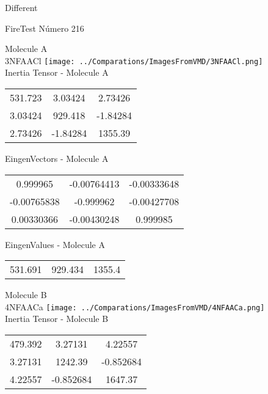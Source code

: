 \begin{center}
\vtab
\vtab
\textcolor{NavyBlue}{\Large Different}
\end{center}

 \newpage

\vtab[-2cm]
\begin{center}
{\large FireTest \tab Número 216}
\end{center}
\begin{multicols}{2}
\begin{center}

Molecule A \\ 
3NFAACl
\texttt{[image: ../Comparations/ImagesFromVMD/3NFAACl.png]}
\\
Inertia Tensor - Molecule A \\
\vtab

\begin{tabular}{|c c c|}
531.723	 & 	3.03424	 & 	2.73426	 \\
3.03424	 & 	929.418	 & 	-1.84284	 \\
2.73426	 & 	-1.84284	 & 	1355.39
\end{tabular}

\vtab
 EingenVectors - Molecule A     \\
\vtab
\begin{tabular}{|c c c|}
0.999965	 & 	-0.00764413	 & 	-0.00333648	 \\
-0.00765838	 & 	-0.999962	 & 	-0.00427708	 \\
0.00330366	 & 	-0.00430248	 & 	0.999985
\end{tabular}

\vtab
 EingenValues - Molecule A     \\
\vtab
\begin{tabular}{|c c c|}
531.691	 & 	929.434	 & 	1355.4	 \\
\end{tabular}
\columnbreak

Molecule B \\ 
4NFAACa
\texttt{[image: ../Comparations/ImagesFromVMD/4NFAACa.png]}
\\
Inertia Tensor - Molecule B \\
\vtab

\begin{tabular}{|c c c|}
479.392	 & 	3.27131	 & 	4.22557	 \\
3.27131	 & 	1242.39	 & 	-0.852684	 \\
4.22557	 & 	-0.852684	 & 	1647.37
\end{tabular}


\end{center}
\end{multicols}
